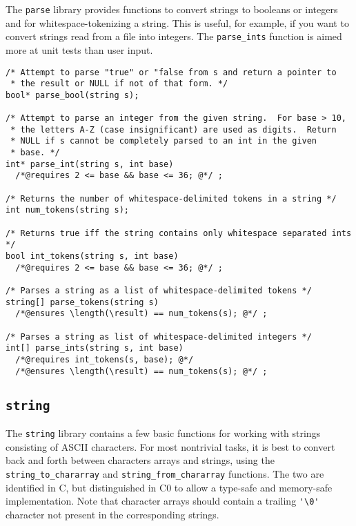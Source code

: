 \documentclass[11pt]{article}
\begin{document}
The \verb'parse' library provides functions to convert strings to
booleans or integers and for whitespace-tokenizing a string.  This is
useful, for example, if you want to convert strings read from a file
into integers. The \verb'parse_ints' function is aimed more at unit
tests than user input.
\begin{small}
\begin{verbatim}
/* Attempt to parse "true" or "false from s and return a pointer to
 * the result or NULL if not of that form. */
bool* parse_bool(string s);

/* Attempt to parse an integer from the given string.  For base > 10,
 * the letters A-Z (case insignificant) are used as digits.  Return
 * NULL if s cannot be completely parsed to an int in the given
 * base. */
int* parse_int(string s, int base)
  /*@requires 2 <= base && base <= 36; @*/ ;

/* Returns the number of whitespace-delimited tokens in a string */
int num_tokens(string s);

/* Returns true iff the string contains only whitespace separated ints */
bool int_tokens(string s, int base)
  /*@requires 2 <= base && base <= 36; @*/ ;

/* Parses a string as a list of whitespace-delimited tokens */
string[] parse_tokens(string s)
  /*@ensures \length(\result) == num_tokens(s); @*/ ;

/* Parses a string as list of whitespace-delimited integers */
int[] parse_ints(string s, int base)
  /*@requires int_tokens(s, base); @*/
  /*@ensures \length(\result) == num_tokens(s); @*/ ;
\end{verbatim}
\end{small}

\clearpage
\subsection{\tt string}

The \verb'string' library contains a few basic functions for working
with strings consisting of ASCII characters.  For most nontrivial
tasks, it is best to convert back and forth between characters arrays
and strings, using the \verb'string_to_chararray' and
\verb'string_from_chararray' functions.  The two are identified in C,
but distinguished in C0 to allow a type-safe and memory-safe
implementation.  Note that character arrays should contain a trailing
\verb"'\0'" character not present in the corresponding strings.
\end{document}
